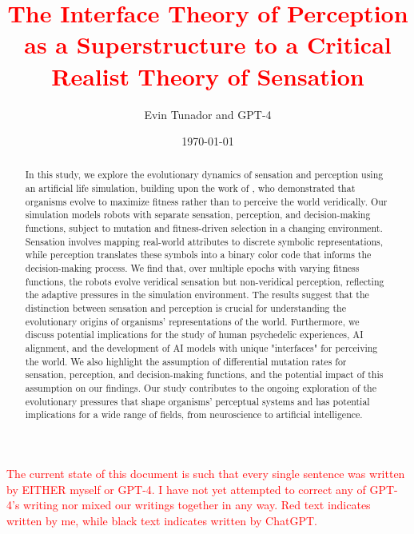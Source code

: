 \documentclass{article}[10pt]
\title{\textcolor{red}{The Interface Theory of Perception as a Superstructure to a Critical Realist Theory of Sensation}}
\author{Evin Tunador and GPT-4}
\date{\today}
\begin{document}
\onehalfspacing

\nocite{}

\maketitle

\begin{abstract}
In this study, we explore the evolutionary dynamics of sensation and perception using an artificial life simulation, building upon the work of , who demonstrated that organisms evolve to maximize fitness rather than to perceive the world veridically. 
Our simulation models robots with separate sensation, perception, and decision-making functions, subject to mutation and fitness-driven selection in a changing environment. 
Sensation involves mapping real-world attributes to discrete symbolic representations, while perception translates these symbols into a binary color code that informs the decision-making process. 
We find that, over multiple epochs with varying fitness functions, the robots evolve veridical sensation but non-veridical perception, reflecting the adaptive pressures in the simulation environment. 
The results suggest that the distinction between sensation and perception is crucial for understanding the evolutionary origins of organisms' representations of the world. 
Furthermore, we discuss potential implications for the study of human psychedelic experiences, AI alignment, and the development of AI models with unique "interfaces" for perceiving the world. 
We also highlight the assumption of differential mutation rates for sensation, perception, and decision-making functions, and the potential impact of this assumption on our findings. 
Our study contributes to the ongoing exploration of the evolutionary pressures that shape organisms' perceptual systems and has potential implications for a wide range of fields, from neuroscience to artificial intelligence.
\end{abstract}

\begin{center}
    \textcolor{red}{The current state of this document is such that every single sentence was written by EITHER myself or GPT-4. I have not yet attempted to correct any of GPT-4's writing nor mixed our writings together in any way. Red text indicates written by me, while black text indicates written by ChatGPT.}
\end{center}

\newpage
\end{document}
